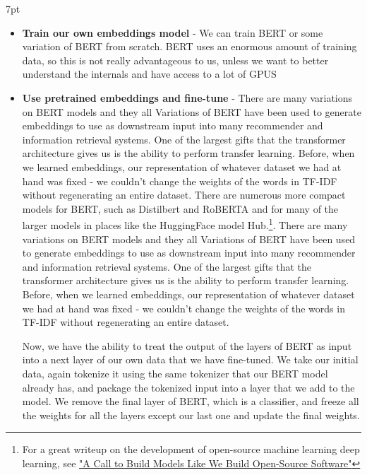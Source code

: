 \documentclass[11pt, table]{diazessay} %
\newenvironment{formal}{%
  \def\FrameCommand{%
    \hspace{1pt}%
    {\color{w_lightblue}\vrule width 2pt}%
    {\color{formalshade}\vrule width 4pt}%
    \colorbox{formalshade}%
  }%
  \MakeFramed{\advance\hsize-\width\FrameRestore}%
  \noindent\hspace{-4.55pt}%
  \begin{adjustwidth}{}{7pt}%
  \vspace{2pt}\vspace{2pt}%
}
{%
  \vspace{2pt}\end{adjustwidth}\endMakeFramed%
}
\begin{document}
\begin{sloppypar}
\begin{formal}
\begin{itemize}
\item \textbf{Train our own embeddings model} - We can train BERT or some variation of BERT from scratch. BERT uses an enormous amount of training data, so this is not really advantageous to us, unless we want to better understand the internals and have access to a lot of GPUS
\item \textbf{Use pretrained embeddings and fine-tune } - There are many variations on BERT models and they all Variations of BERT have been used to generate embeddings to use as downstream input into many recommender and information retrieval systems.  One of the largest gifts that the transformer architecture gives us is the ability to perform transfer learning. Before, when we learned embeddings, our representation of whatever dataset we had at hand was fixed - we couldn't change the weights of the words in TF-IDF without regenerating an entire dataset. There are numerous more compact models for BERT, such as Distilbert and RoBERTA and for many of the larger models in places like the HuggingFace model Hub.\footnote{For a great writeup on the development of open-source machine learning deep learning, see  \href{https://colinraffel.com/blog/a-call-to-build-models-like-we-build-open-source-software.html}{"A Call to Build Models Like We Build Open-Source Software"}}.  There are many variations on BERT models and they all Variations of BERT have been used to generate embeddings to use as downstream input into many recommender and information retrieval systems.  One of the largest gifts that the transformer architecture gives us is the ability to perform transfer learning. Before, when we learned embeddings, our representation of whatever dataset we had at hand was fixed - we couldn't change the weights of the words in TF-IDF without regenerating an entire dataset. 

Now, we have the ability to treat the output of the layers of BERT as input into a next layer of our own data that we have fine-tuned. We take our initial data, again tokenize it using the same tokenizer that our BERT model already has, and package the tokenized input into a layer that we add to the model. We remove the final layer of BERT, which is a classifier, and freeze all the weights for all the layers except our last one and update the final weights. 




\end{itemize}
\end{formal}


\end{sloppypar}
\end{document}
